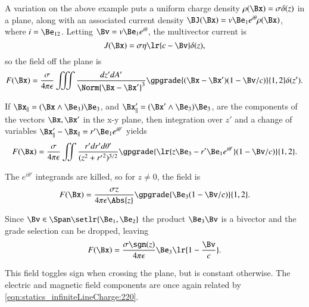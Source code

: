 %
%
A variation on the above example puts a uniform charge density \( \rho(\Bx) = \sigma \delta(z) \) in a plane, along with an associated current density \( \BJ(\Bx) = v \Be_1 e^{i\theta} \rho(\Bx) \), where \( i = \Be_{12} \).  Letting \( \Bv = v \Be_1 e^{i\theta} \), the multivector current is
\begin{dmath}\label{eqn:statics_infinitePlane:240}
J(\Bx) = \sigma \eta \lr{ c - \Bv } \delta(z),
\end{dmath}
so the field off the plane is
\begin{dmath}\label{eqn:statics_infinitePlane:260}
F(\Bx)
=
\frac{\sigma}{4 \pi \epsilon } \iiint \frac{dz' dA'}{ \Norm{ \Bx - \Bx' }^3 }
\gpgrade{ (\Bx - \Bx') (1 - \Bv/c) }{1,2} \delta(z').
\end{dmath}

If \( \Bx_\parallel = (\Bx \wedge \Be_3) \Be_3 \), and \( \Bx'_\parallel = (\Bx' \wedge \Be_3) \Be_3 \), are the components of the vectors \( \Bx, \Bx' \) in the x-y plane, then integration over \( z' \) and a change of variables \( \Bx'_\parallel - \Bx_\parallel = r' \Be_1 e^{i \theta'} \) yields
\begin{dmath}\label{eqn:statics_infinitePlane:280}
F(\Bx)
=
\frac{\sigma}{4 \pi \epsilon } \iint \frac{r' dr' d\theta'}{ ( z^2 + {r'}^2 )^{3/2} }
\gpgrade{ \lr{ z \Be_3 - r' \Be_1 e^{i\theta'} } (1 - \Bv/c) }{1,2}.
\end{dmath}

The \( e^{i\theta'} \) integrands are killed, so for \( z \ne 0 \), the field is
\begin{dmath}\label{eqn:statics_infinitePlane:300}
F(\Bx)
=
\frac{\sigma z}{4 \pi \epsilon \Abs{z} } \gpgrade{ \Be_3 (1 - \Bv/c) }{1,2}.
\end{dmath}

Since \( \Bv \in \Span \setlr{ \Be_1, \Be_2 } \) the product \( \Be_3 \Bv \) is a bivector and the grade selection can be dropped, leaving
\begin{dmath}\label{eqn:statics_infinitePlane:320}
F(\Bx)
=
\frac{\sigma \sgn(z)}{4 \pi \epsilon } \Be_3 \lr{ 1 - \frac{\Bv}{c}}.
\end{dmath}

This field toggles sign when crossing the plane, but is constant otherwise.  The electric and magnetic field components are once again related by \cref{eqn:statics_infiniteLineCharge:220}.


